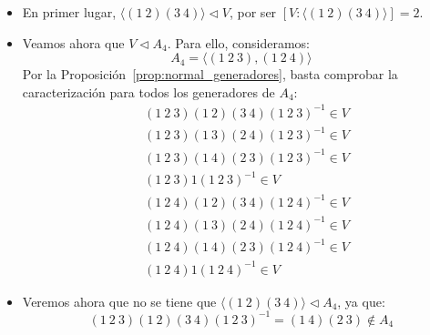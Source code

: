 \begin{ejemplo}
\begin{enumerate}
\begin{figure}[H]
            \end{figure}
            \begin{itemize}
                \item En primer lugar, $\langle (1\ 2)(3\ 4) \rangle \lhd V $, por ser $[V:\langle (1\ 2)(3\ 4) \rangle ] = 2$.
                \item Veamos ahora que $V\lhd A_4$. Para ello, consideramos:
                    \begin{equation*}
                        A_4 = \langle (1\ 2\ 3), (1\ 2\ 4) \rangle 
                    \end{equation*}
                    Por la Proposición~\ref{prop:normal_generadores}, basta comprobar la caracterización para todos los generadores de $A_4$:
                    \begin{align*}
                        &(1\ 2\ 3)(1\ 2)(3\ 4){(1\ 2\ 3)}^{-1} \in  V \\
                        &(1\ 2\ 3)(1\ 3)(2\ 4){(1\ 2\ 3)}^{-1} \in  V \\
                        &(1\ 2\ 3)(1\ 4)(2\ 3){(1\ 2\ 3)}^{-1} \in  V \\
                        &(1\ 2\ 3)1{(1\ 2\ 3)}^{-1} \in  V \\
                        &(1\ 2\ 4)(1\ 2)(3\ 4){(1\ 2\ 4)}^{-1} \in  V \\
                        &(1\ 2\ 4)(1\ 3)(2\ 4){(1\ 2\ 4)}^{-1} \in  V \\
                        &(1\ 2\ 4)(1\ 4)(2\ 3){(1\ 2\ 4)}^{-1} \in  V \\
                        &(1\ 2\ 4)1{(1\ 2\ 4)}^{-1} \in  V 
                    \end{align*}
                \item Veremos ahora que no se tiene que $\langle (1\ 2)(3\ 4) \rangle\lhd A_4 $, ya que:
                    \begin{equation*}
                        (1\ 2\ 3)(1\ 2)(3\ 4){(1\ 2\ 3)}^{-1} = (1\ 4)(2\ 3)\notin A_4
                    \end{equation*}
            \end{itemize}
    \end{enumerate}
\end{ejemplo}

